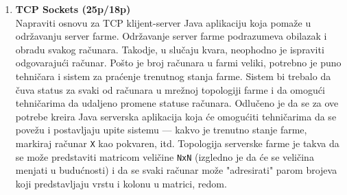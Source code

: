 \documentclass[]{article}
\begin{document}
\begin{enumerate}

\item \textbf{TCP Sockets (25p/18p)}
\\Napraviti osnovu za TCP klijent-server Java aplikaciju koja poma\v{z}e u odr\v{z}avanju server farme. Odr\v{z}avanje server farme podrazumeva obilazak i obradu svakog ra\v{c}unara. Takodje, u slučaju kvara, neophodno je ispraviti odgovaraju\'c{}i ra\v{c}unar. Po\v{s}to je broj ra\v{c}unara u farmi veliki, potrebno je puno tehni\v{c}ara i sistem za pra\'c{}enje trenutnog stanja farme. Sistem bi trebalo da \v{c}uva status za svaki od ra\v{c}unara u mre\v{z}noj topologiji farme i da omogu\'c{}i tehni\v{c}arima da udaljeno promene statuse ra\v{c}unara. Odlu\v{c}eno je da se za ove potrebe kreira Java serverska aplikacija koja \'c{}e omogu\'c{}iti tehni\v{c}arima da se pove\v{z}u i postavljaju upite sistemu --- kakvo je trenutno stanje farme, markiraj ra\v{c}unar \texttt{X} kao pokvaren, itd. Topologija serverske farme je takva da se mo\v{z}e predstaviti matricom veli\v{c}ine \texttt{NxN} (izgledno je da \'c{}e se veli\v{c}ina menjati u budu\'c{}nosti) i da se svaki ra\v{c}unar mo\v{z}e "adresirati" parom brojeva koji predstavljaju vrstu i kolonu u matrici, redom.


\end{enumerate}
\end{document}
